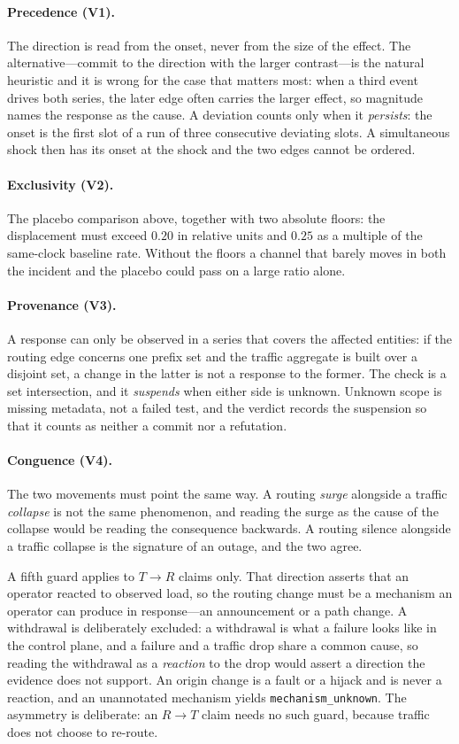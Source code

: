 \paragraph{Precedence (V1).} The direction is read from the onset, never
from the size of the effect. The alternative---commit to the direction
with the larger contrast---is the natural heuristic and it is wrong for
the case that matters most: when a third event drives both series, the
later edge often carries the larger effect, so magnitude names the
response as the cause. A deviation counts only when it \emph{persists}:
the onset is the first slot of a run of three consecutive deviating
slots. A simultaneous shock then has its onset at the shock and the two
edges cannot be ordered.

\paragraph{Exclusivity (V2).} The placebo comparison above, together with
two absolute floors: the displacement must exceed $0.20$ in relative
units and $0.25$ as a multiple of the same-clock baseline rate. Without
the floors a channel that barely moves in both the incident and the
placebo could pass on a large ratio alone.

\paragraph{Provenance (V3).} A response can only be observed in a series
that covers the affected entities: if the routing edge concerns one prefix
set and the traffic aggregate is built over a disjoint set, a change in the
latter is not a response to the former. The check is a set intersection,
and it \emph{suspends} when either side is unknown. Unknown scope is
missing metadata, not a failed test, and the verdict records the
suspension so that it counts as neither a commit nor a refutation.

\paragraph{Conguence (V4).} The two movements must point the same way. A
routing \emph{surge} alongside a traffic \emph{collapse} is not the same
phenomenon, and reading the surge as the cause of the collapse would be
reading the consequence backwards. A routing silence alongside a traffic
collapse is the signature of an outage, and the two agree.

A fifth guard applies to $T\to R$ claims only. That direction asserts
that an operator reacted to observed load, so the routing change must be a
mechanism an operator can produce in response---an announcement or a path
change. A withdrawal is deliberately excluded: a withdrawal is what a
failure looks like in the control plane, and a failure and a traffic
drop share a common cause, so reading the withdrawal as a \emph{reaction}
to the drop would assert a direction the evidence does not support. An
origin change is a fault or a hijack and is never a reaction, and an
unannotated mechanism yields \texttt{mechanism\_unknown}. The asymmetry is
deliberate: an $R\to T$ claim needs no such guard, because traffic does
not choose to re-route.

